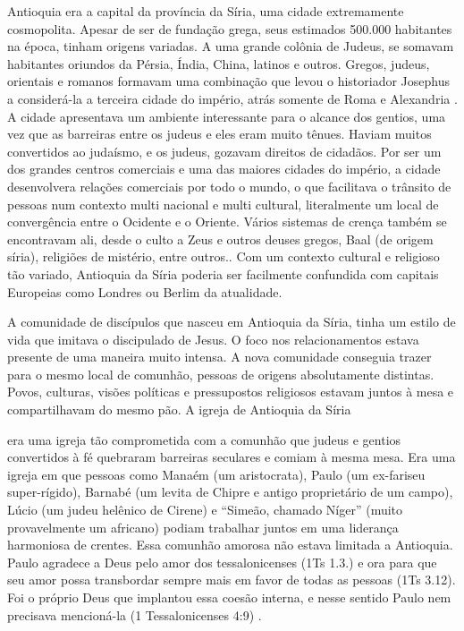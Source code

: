 \documentclass[12pt,openright,oneside,a4paper,
english,french,spanish,brazil]{abntex2}
\begin{document}
Antioquia era a capital da província da Síria, uma cidade extremamente cosmopolita. Apesar de ser de fundação grega, seus estimados 500.000 habitantes na época, tinham origens variadas. A uma grande colônia de Judeus, se somavam habitantes oriundos da Pérsia, Índia, China, latinos e outros. Gregos, judeus, orientais e romanos formavam uma combinação que levou o historiador Josephus a considerá-la a terceira cidade do império, atrás somente de Roma e Alexandria \cite[p. 185]{stott}. A cidade apresentava um ambiente interessante para o alcance dos gentios, uma vez que as barreiras entre os judeus e eles eram muito tênues. Haviam muitos convertidos ao judaísmo, e os judeus, gozavam direitos de cidadãos. Por ser um dos grandes centros comerciais e uma das maiores cidades do império, a cidade desenvolvera relações comerciais por todo o mundo, o que facilitava o trânsito de pessoas num contexto multi nacional e multi cultural, literalmente um local de convergência entre o Ocidente e o Oriente. Vários sistemas de crença também se encontravam ali, desde o culto a Zeus e outros deuses gregos, Baal (de origem síria), religiões de mistério, entre outros.\cite[p. 166,167]{green}. Com um contexto cultural e religioso tão variado, Antioquia da Síria poderia ser facilmente confundida com capitais Europeias como Londres ou Berlim da atualidade.


A comunidade de discípulos que nasceu em Antioquia da Síria, tinha um estilo de vida que imitava o discipulado de Jesus. O foco nos relacionamentos estava presente de uma maneira muito intensa. A nova comunidade conseguia trazer para o mesmo local de comunhão, pessoas de origens absolutamente distintas. Povos, culturas, visões políticas e pressupostos religiosos estavam juntos à mesa e compartilhavam do mesmo pão. A igreja de Antioquia da Síria

\begin{citacao}
era uma igreja tão comprometida com a comunhão que judeus e gentios convertidos à fé quebraram barreiras seculares e comiam à mesma mesa. Era uma igreja em que pessoas como Manaém (um aristocrata), Paulo (um ex-fariseu super-rígido), Barnabé (um levita de Chipre e antigo proprietário de um campo), Lúcio (um judeu helênico de Cirene) e “Simeão, chamado Níger” (muito provavelmente um africano) podiam trabalhar juntos em uma liderança harmoniosa de crentes. Essa comunhão amorosa não estava limitada a Antioquia. Paulo agradece a Deus pelo amor dos tessalonicenses (1Ts 1.3.) e ora para que seu amor possa transbordar sempre mais em favor de todas as pessoas (1Ts 3.12). Foi o próprio Deus que implantou essa coesão interna, e nesse sentido Paulo nem precisava mencioná-la (1 Tessalonicenses 4:9) \cite[p. 261]{green}.
\end{citacao}
\end{document}
